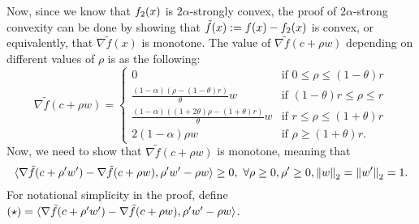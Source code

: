 Now, since we know that $f_{2}(x)$ is $2\alpha$-strongly convex, 
the proof of $2\alpha$-strong convexity can be done by showing that
$\tilde f(x) := f(x) - f_{2}(x)$ is convex, or equivalently, that $\nabla \tilde f(x)$ is monotone.
The value of $\nabla \tilde f(c + \rho w)$ depending on different values of $\rho$ is as the following:
\begin{equation*}
	\nabla \tilde f(c+\rho w) =
	\begin{cases}
		0 						
		& \text{if } 0 \leq \rho \leq (1-\theta)r\\
		\frac{(1-\alpha)(\rho - (1-\theta) r)}{\theta} w
		& \text{if } (1-\theta)r \leq \rho \leq r\\
		\frac{(1-\alpha)((1+2\theta) \rho - (1+\theta) r)}{\theta} w
		& \text{if } r \leq \rho \leq (1+\theta) r\\
		2(1-\alpha) \rho w
		& \text{if } \rho \geq (1+\theta) r.
	\end{cases}
\end{equation*}
Now, we need to show that $\nabla \tilde f(c+\rho w)$ is monotone, meaning that
\begin{equation*}
	\langle
	\nabla \tilde f(c+\rho' w') - \nabla \tilde f(c+\rho w),
	\rho' w' - \rho w
	\rangle \geq 0
	,~ \forall \rho \geq 0, \rho' \geq 0, \left\|{w}\right\|_2 = \left\|{w'}\right\|_2 = 1.
\end{equation*}
For notational simplicity in the proof, define 
$(\star) = \langle
\nabla \tilde f(c+\rho' w') - \nabla \tilde f(c+\rho w),
\rho' w' - \rho w
\rangle$.
